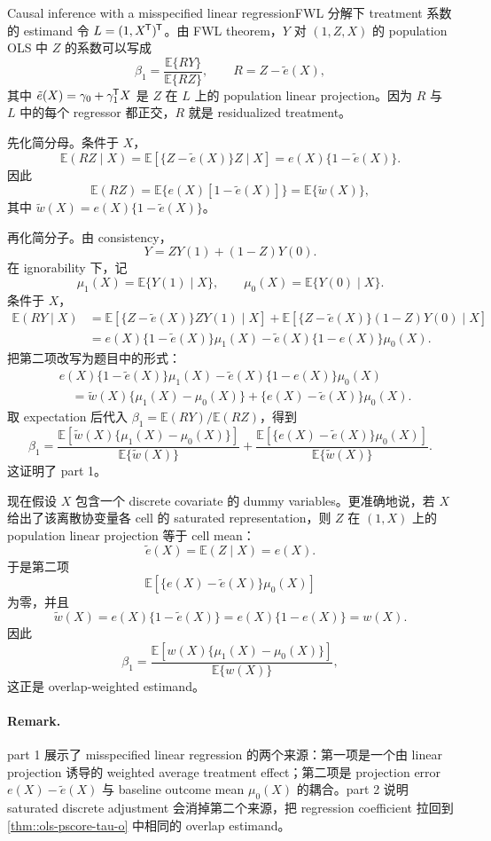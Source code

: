 \begin{exercisesolution}{Causal inference with a misspecified linear regression}{FWL 分解下 treatment 系数的 estimand}
令 $L=(1,X^{\mkern-1.5mu\mathsf{T}})^{\mkern-1.5mu\mathsf{T}}$。由 FWL theorem，$Y$ 对 $(1,Z,X)$ 的 population OLS 中 $Z$ 的系数可以写成
\[
\beta_1=\frac{\mathbb{E}\{RY\}}{\mathbb{E}\{RZ\}},
\qquad
R=Z-\tilde e(X),
\]
其中 $\tilde e(X)=\gamma_0+\gamma_1^{\mkern-1.5mu\mathsf{T}} X$ 是 $Z$ 在 $L$ 上的 population linear projection。因为 $R$ 与 $L$ 中的每个 regressor 都正交，$R$ 就是 residualized treatment。

先化简分母。条件于 $X$，
\[
\mathbb{E}(RZ\mid X)=\mathbb{E}[\{Z-\tilde e(X)\}Z\mid X]
=e(X)\{1-\tilde e(X)\}.
\]
因此
\[
\mathbb{E}(RZ)=\mathbb{E}\{e(X)[1-\tilde e(X)]\}=\mathbb{E}\{\tilde w(X)\},
\]
其中 $\tilde w(X)=e(X)\{1-\tilde e(X)\}$。

再化简分子。由 consistency，
\[
Y=ZY(1)+(1-Z)Y(0).
\]
在 ignorability 下，记
\[
\mu_1(X)=\mathbb{E}\{Y(1)\mid X\},\qquad
\mu_0(X)=\mathbb{E}\{Y(0)\mid X\}.
\]
条件于 $X$，
\begin{align*}
\mathbb{E}(RY\mid X)
&=\mathbb{E}[\{Z-\tilde e(X)\}ZY(1)\mid X]
  +\mathbb{E}[\{Z-\tilde e(X)\}(1-Z)Y(0)\mid X]\\
&=e(X)\{1-\tilde e(X)\}\mu_1(X)
  -\tilde e(X)\{1-e(X)\}\mu_0(X).
\end{align*}
把第二项改写为题目中的形式：
\begin{align*}
&e(X)\{1-\tilde e(X)\}\mu_1(X)
  -\tilde e(X)\{1-e(X)\}\mu_0(X)\\
&\quad
=\tilde w(X)\{\mu_1(X)-\mu_0(X)\}
  +\{e(X)-\tilde e(X)\}\mu_0(X).
\end{align*}
取 expectation 后代入 $\beta_1=\mathbb{E}(RY)/\mathbb{E}(RZ)$，得到
\[
\beta_1 =
\frac{\mathbb{E} [\tilde{w}(X) \{ \mu_1(X) - \mu_0(X) \} ]}{\mathbb{E} \{ \tilde{w}(X) \}}
+ \frac{\mathbb{E} [\{e(X)-\tilde{e}(X)\} \mu_0(X)]}{\mathbb{E} \{ \tilde{w}(X) \}}.
\]
这证明了 part 1。

现在假设 $X$ 包含一个 discrete covariate 的 dummy variables。更准确地说，若 $X$ 给出了该离散协变量各 cell 的 saturated representation，则 $Z$ 在 $(1,X)$ 上的 population linear projection 等于 cell mean：
\[
\tilde e(X)=\mathbb{E}(Z\mid X)=e(X).
\]
于是第二项
\[
\mathbb{E}[\{e(X)-\tilde e(X)\}\mu_0(X)]
\]
为零，并且
\[
\tilde w(X)=e(X)\{1-\tilde e(X)\}=e(X)\{1-e(X)\}=w(X).
\]
因此
\[
\beta_1 =
\frac{\mathbb{E} [w(X) \{ \mu_1(X) - \mu_0(X) \} ]}{\mathbb{E} \{ w(X) \}},
\]
这正是 overlap-weighted estimand。

\paragraph{Remark.}
part 1 展示了 misspecified linear regression 的两个来源：第一项是一个由 linear projection 诱导的 weighted average treatment effect；第二项是 projection error $e(X)-\tilde e(X)$ 与 baseline outcome mean $\mu_0(X)$ 的耦合。part 2 说明 saturated discrete adjustment 会消掉第二个来源，把 regression coefficient 拉回到 \cref{thm::ols-pscore-tau-o} 中相同的 overlap estimand。
\end{exercisesolution}

